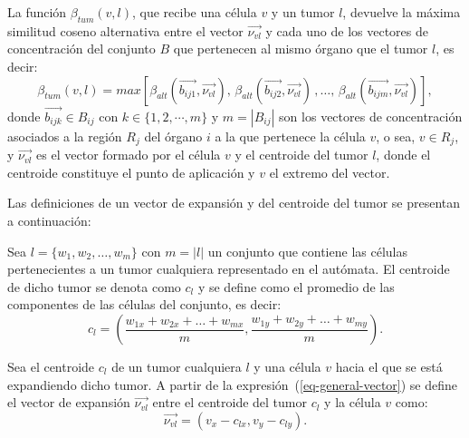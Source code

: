 \begin{definition}
\label{def-beta}
La funci\'on $\beta_{tum}(v,l)$, que recibe una c\'elula $v$ y un tumor $l$, devuelve la m\'axima similitud coseno alternativa entre el vector $\overrightarrow{\nu_{vl}}$ y cada uno de los vectores de concentraci\'on del conjunto $B$ que pertenecen al mismo \'organo que el tumor $l$, es decir:
\begin{equation}
\beta_{tum}(v,l) = max\left[\beta_{alt}(\overrightarrow{b_{ij1}},\overrightarrow{\nu_{vl}}),\,\beta_{alt}(\overrightarrow{b_{ij2}}, \overrightarrow{\nu_{vl}})\,,\ldots,\,\beta_{alt}(\overrightarrow{b_{ijm}}, \overrightarrow{\nu_{vl}})\right], \label{eq-beta}
\end{equation}
donde $\overrightarrow{b_{ijk}} \in B_{ij}$ con $k \in \lbrace 1,2,\cdots,m \rbrace$ y $m=|B_{ij}|$ son los vectores de concentraci\'on asociados a la regi\'on $R_j$ del \'organo $i$ a la que pertenece la c\'elula $v$, o sea, $v \in R_j$, y $\overrightarrow{\nu_{vl}}$ es el vector formado por el c\'elula $v$ y el centroide del tumor $l$, donde el centroide constituye el punto de aplicaci\'on y $v$ el extremo del vector. 
\end{definition}

Las definiciones de un vector de expansi\'on y del centroide del tumor se presentan a continuaci\'on:

\begin{definition}
\label{def-centroid}
Sea $l=\lbrace w_1,w_2,\ldots,w_{m}\rbrace$ con $m=|l|$ un conjunto que contiene las c\'elulas pertenecientes a un tumor cualquiera representado en el aut\'omata. El centroide de dicho tumor se denota como $c_l$ y se define como el promedio de las componentes de las c\'elulas del conjunto, es decir:
\begin{equation}
c_l = \left(\frac{w_{1x} + w_{2x} + \ldots + w_{mx}}{m}, \frac{w_{1y} + w_{2y} + \ldots + w_{my}}{m} \right). \label{eq-centroid}
\end{equation}
\end{definition}

\begin{definition}
\label{def-exp-vector}
Sea el centroide $c_l$ de un tumor cualquiera $l$ y una c\'elula $v$ hacia el que se est\'a expandiendo dicho tumor. A partir de la expresi\'on~(\ref{eq-general-vector}) se define el vector de expansi\'on $\overrightarrow{\nu_{vl}}$ entre el centroide del tumor $c_l$ y la c\'elula $v$ como:
\begin{equation}
\overrightarrow{\nu_{vl}} = \left(v_x - c_{lx}, v_y - c_{ly} \right). \label{eq-exp-vector}
\end{equation}
\end{definition}

